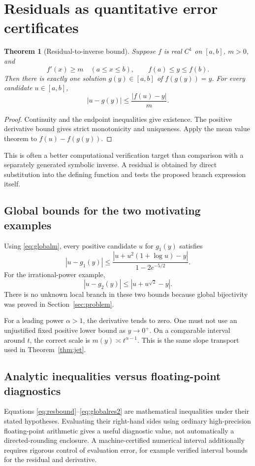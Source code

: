 \documentclass[11pt,a4paper]{article}
\numberwithin{equation}{section}
\newtheorem{theorem}{Theorem}[section]
\theoremstyle{definition}\newtheorem{definition}[theorem]{Definition}
\theoremstyle{remark}\newtheorem{remark}[theorem]{Remark}
\begin{document}
\section{Residuals as quantitative error certificates}
\label{sec:residual}
\begin{theorem}[Residual-to-inverse bound]\label{thm:residual}
Suppose $f$ is real $C^1$ on $[a,b]$, $m>0$, and
\[
f'(x)\ge m\quad(a\le x\le b),\qquad f(a)\le y\le f(b).
\]
Then there is exactly one solution $g(y)\in[a,b]$ of $f(g(y))=y$. For every candidate $u\in[a,b]$,
\begin{equation}\label{eq:resbound}
|u-g(y)|\le\frac{|f(u)-y|}{m}.
\end{equation}
\end{theorem}
\begin{proof}
Continuity and the endpoint inequalities give existence. The positive derivative bound gives strict monotonicity and uniqueness. Apply the mean value theorem to $f(u)-f(g(y))$.
\end{proof}

This is often a better computational verification target than comparison with a separately generated symbolic inverse. A residual is obtained by direct substitution into the defining function and tests the proposed branch expression itself.

\subsection{Global bounds for the two motivating examples}
Using \eqref{eq:globalm}, every positive candidate $u$ for $g_1(y)$ satisfies
\begin{equation}\label{eq:globalres1}
|u-g_1(y)|\le\frac{|u+u^2(1+\log u)-y|}{1-2e^{-5/2}}.
\end{equation}
For the irrational-power example,
\begin{equation}\label{eq:globalres2}
|u-g_2(y)|\le |u+u^{\sqrt2}-y|.
\end{equation}
There is no unknown local branch in these two bounds because global bijectivity was proved in Section~\ref{sec:problem}.

For a leading power $\alpha>1$, the derivative tends to zero. One must not use an unjustified fixed positive lower bound as $y\to0^+$. On a comparable interval around $t$, the correct scale is $m(y)\asymp t^{\alpha-1}$. This is the same slope transport used in Theorem~\ref{thm:jet}.

\subsection{Analytic inequalities versus floating-point diagnostics}
Equations \eqref{eq:resbound}--\eqref{eq:globalres2} are mathematical inequalities under their stated hypotheses. Evaluating their right-hand sides using ordinary high-precision floating-point arithmetic gives a useful diagnostic value, not automatically a directed-rounding enclosure. A machine-certified numerical interval additionally requires rigorous control of evaluation error, for example verified interval bounds for the residual and derivative.
\end{document}
